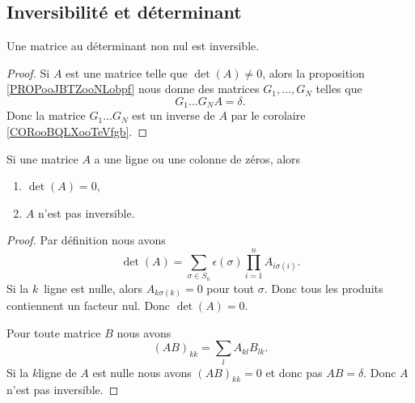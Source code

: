 \subsection{Inversibilité et déterminant}

\begin{proposition}     \label{PROPooAVIXooMtVCet}
    Une matrice au déterminant non nul est inversible.
\end{proposition}

\begin{proof}
    Si \( A\) est une matrice telle que \( \det(A)\neq 0\), alors la proposition \ref{PROPooJBTZooNLobpf} nous donne des matrices \( G_1,\ldots, G_N\) telles que
    \begin{equation}
        G_1\ldots G_NA=\delta.
    \end{equation}
    Donc la matrice \( G_1\ldots G_N\) est un inverse de \( A\) par le corolaire \ref{CORooBQLXooTeVfgb}.
\end{proof}

\begin{proposition}     \label{PROPooEOKBooKUROFg}
    Si une matrice \( A\) a une ligne ou une colonne de zéros, alors
    \begin{enumerate}
        \item
            \( \det(A)=0\),
        \item
            \( A\) n'est pas inversible.
    \end{enumerate}
\end{proposition}

\begin{proof}
    Par définition nous avons
    \begin{equation}
        \det(A)=\sum_{\sigma\in S_n}\epsilon(\sigma)\prod_{i=1}^nA_{i\sigma(i)}.
    \end{equation}
    Si la \( k\)\ieme\ ligne est nulle, alors \( A_{k\sigma(k)}=0\) pour tout \( \sigma\). Donc tous les produits contiennent un facteur nul. Donc \( \det(A)=0\).

    Pour toute matrice \( B\) nous avons
    \begin{equation}
        (AB)_{kk}=\sum_lA_{kl}B_{lk}.
    \end{equation}
    Si la \( k\)\ieme ligne de \( A\) est nulle nous avons \( (AB)_{kk}=0\) et donc pas \( AB=\delta\). Donc \( A\) n'est pas inversible.
\end{proof}


